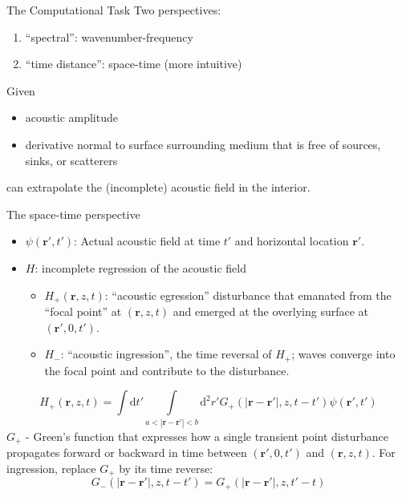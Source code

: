 \documentclass{beamer}
\begin{document}
\begin{frame}{The Computational Task}
    Two perspectives:
    \begin{enumerate}
        \item ``spectral'': wavenumber-frequency
        \item ``time distance'': space-time (more intuitive)
    \end{enumerate}
    Given
    \begin{itemize}
        \item acoustic amplitude
        \item derivative normal to surface surrounding medium that is
            free of sources, sinks, or scatterers
    \end{itemize}
    can extrapolate the (incomplete) acoustic field in the interior.
\end{frame}

\begin{frame}{The space-time perspective}
    \begin{itemize}
        \item $\psi(\mathbf{r}',t')$: Actual acoustic field at time $t'$
            and horizontal location $\mathbf{r}'$.
        \item $H$: incomplete regression of the acoustic field
            \begin{itemize}
                \item $H_{+}(\mathbf{r},z,t)$: ``acoustic egression''
                    disturbance that emanated from the ``focal point''
                    at $(\mathbf{r},z,t)$ and emerged at the overlying surface
                    at $(\mathbf{r}',0,t')$.
                \item $H_{-}$: ``acoustic ingression'', the time reversal
                    of $H_{+}$; waves converge into the focal point
                    and contribute to the disturbance.
            \end{itemize}
    \end{itemize}
    $$ H_{+}(\mathbf{r},z,t) = \int
    \textrm{d}t' \int\limits_{a<|\mathbf{r}-\mathbf{r}'|<b}
    \textrm{d}^{2}r'G_{+}
    (|\mathbf{r}-\mathbf{r}'|,z,t-t')\psi(\mathbf{r}',t')  $$
    $G_{+}$ - Green's function that expresses how a single transient point
    disturbance propagates forward or backward in time between
    $(\mathbf{r}',0,t')$ and $(\mathbf{r},z,t)$.
    For ingression, replace $G_{+}$ by its time reverse:
    $$ G_{-}(|\mathbf{r}-\mathbf{r'}|,z,t-t') =
    G_{+}(|\mathbf{r}-\mathbf{r'}|,z,t'-t) $$
\end{frame}
\end{document}
